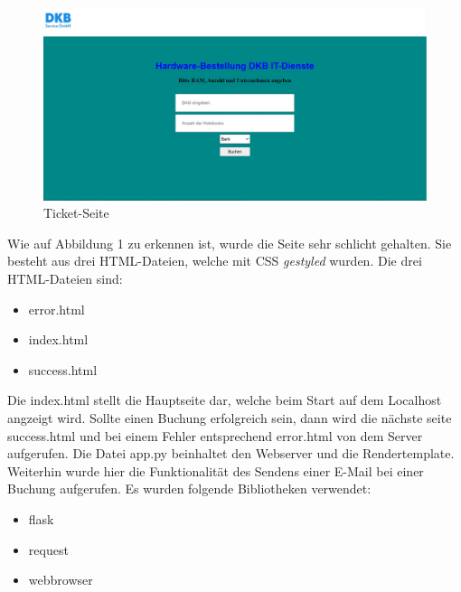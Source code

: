 \begin{figure}[H] 
  \centering
     \includegraphics[width=1\textwidth]{ticketseite.jpg}
  \caption{Ticket-Seite}
  \label{fig:Bild1}
\end{figure}

\noindent
Wie auf Abbildung 1 zu erkennen ist, wurde die Seite sehr schlicht gehalten. Sie besteht aus drei HTML-Dateien, welche mit CSS \textit{gestyled} wurden. Die drei HTML-Dateien sind:

\begin{itemize}
	\item error.html
	\item index.html
	\item success.html
\end{itemize}

\noindent
Die index.html stellt die Hauptseite dar, welche beim Start auf dem Localhost angzeigt wird. Sollte einen Buchung erfolgreich sein, dann wird die nächste seite success.html und bei einem Fehler entsprechend error.html von dem Server aufgerufen. Die Datei app.py beinhaltet den Webserver und die Rendertemplate. Weiterhin wurde hier die Funktionalität des Sendens einer E-Mail bei einer Buchung aufgerufen. Es wurden folgende Bibliotheken verwendet:
\begin{itemize}
	\item flask
	\item request
	\item webbrowser
\end{itemize}

